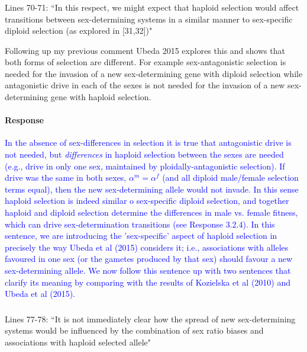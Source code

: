\documentclass[10pt,letterpaper]{article}
\begin{document}
\noindent\subsubsection{}
Lines 70-71: ``In this respect, we might expect that haploid selection would affect transitions between sex-determining systems in a similar manner to sex-specific diploid selection (as explored in [31,32])" 

Following up my previous comment Ubeda 2015 explores this and shows that both forms of selection are different. For example sex-antagonistic selection is needed for the invasion of a new sex-determining gene with diploid selection while antagonistic drive in each of the sexes is not needed for the invasion of a new sex-determining gene with haploid selection.

\noindent\paragraph{Response}
\textcolor{blue}{In the absence of sex-differences in selection it is true that antagonistic drive is not needed, but \textit{differences} in haploid selection between the sexes are needed (e.g., drive in only one sex, maintained by ploidally-antagonistic selection). 
If drive was the same in both sexes, $\alpha^{m}=\alpha^{f}$ (and all diploid male/female selection terms equal), then the new sex-determining allele would not invade. 
In this sense haploid selection is indeed similar o sex-specific diploid selection, and together haploid and diploid selection determine the differences in male vs. female fitness, which can drive sex-determination transitions (see Response 3.2.4).
In this sentence, we are introducing the 'sex-specific' aspect of haploid selection in precisely the way Ubeda et al (2015) considers it; i.e., associations with alleles favoured in one sex (or the gametes produced by that sex) should favour a new sex-determining allele.
We now follow this sentence up with two sentences that clarify its meaning by comparing with the results of Kozielska et al (2010) and Ubeda et al (2015).}

\noindent\subsubsection{}
Lines 77-78: ``It is not immediately clear how the spread of new sex-determining systems would be influenced by the combination of sex ratio biases and associations with haploid selected allele"
\end{document}
